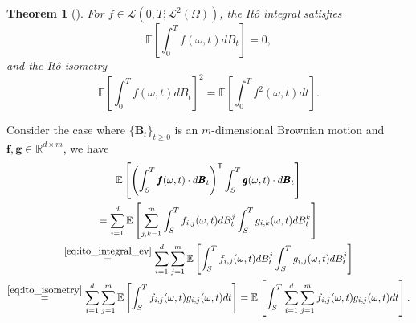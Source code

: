 \documentclass[12pt]{article}
\newtheorem{theorem}{Theorem}[section]
\theoremstyle{definition}
\numberwithin{equation}{section}
\newcommand{\R}{\mathbb{R}}
\newcommand{\E}{\mathbb{E}}
\newcommand{\CL}{\mathcal{L}}
\newcommand{\ev}[1]{\mathbb{E}\left[{#1}\right]}
\begin{document}
\begin{theorem}[\autocite{eAppliedStochasticAnalysis2021}]
  \label{thm:ito_isometry}
  For $f \in \CL(0,T;\CL^2(\Omega))$, the Itô integral satisfies
  \begin{equation}
    \label{eq:ito_integral_ev}
    \E \left[ \int_0^T f(\omega,t)dB_t \right] = 0,
  \end{equation}
  and the \emph{Itô isometry}
  \begin{equation}
    \label{eq:ito_isometry}
    \E \left[ \int_0^T f(\omega,t)dB_t \right]^2 = \E \left[ \int_0^T f^2(\omega,t)dt \right].
  \end{equation}
\end{theorem}
Consider the case where $\{\pmb{B}_t\}_{t\geq0}$ is an $m$-dimensional Brownian motion and $\pmb{f},\pmb{g}  \in \R^{d \times m}$, we have
\begin{multline*}
  \ev{\left(\int_S^T \pmb{f}(\omega, t)\cdot d\pmb{B}_t\right)^\mathsf{T}\int_S^T \pmb{g}(\omega, t)\cdot d\pmb{B}_t}\\
     = \sum_{i=1}^d \ev{\sum_{j,k=1}^m \int_S^T f_{i,j}(\omega, t)dB_t^j\int_S^T g_{i,k}(\omega, t)dB_t^k}\\
    \overset{\eqref{eq:ito_integral_ev}}{=} \sum_{i=1}^d \sum_{j=1}^m \ev{\int_S^T f_{i,j}(\omega, t)dB_t^j\int_S^T g_{i,j}(\omega, t)dB_t^j} \\
    \overset{\eqref{eq:ito_isometry}}{=} \sum_{i=1}^d \sum_{j=1}^m \ev{\int_S^T f_{i,j}(\omega, t)g_{i,j}(\omega, t)dt}
    = \ev{\int_S^T \sum_{i=1}^d \sum_{j=1}^m f_{i,j}(\omega, t)g_{i,j}(\omega, t)dt}.
\end{multline*}
\end{document}
